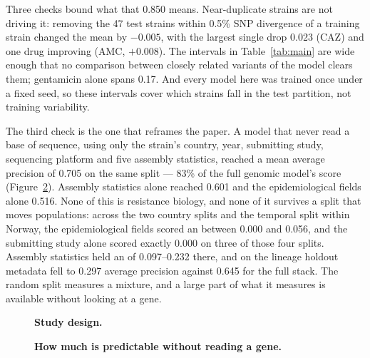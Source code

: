 Three checks bound what that 0.850 means. Near-duplicate strains are not driving it: removing the 47
test strains within 0.5\% SNP divergence of a training strain changed the mean by $-0.005$, with the
largest single drop 0.023 (CAZ) and one drug improving (AMC, $+0.008$). The intervals in
Table~\ref{tab:main} are wide enough that no comparison between closely related variants of the
model clears them; gentamicin alone spans 0.17. And every model here was trained once under a fixed
seed, so these intervals cover which strains fall in the test partition, not training variability.

The third check is the one that reframes the paper. A model that never read a base of sequence,
using only the strain's country, year, submitting study, sequencing platform and five assembly
statistics, reached a mean average precision of 0.705 on the same split --- 83\% of the full
genomic model's score (Figure~\ref{fig:floor}). Assembly statistics alone reached 0.601 and the
epidemiological fields alone 0.516. None of this is resistance biology, and none of it survives a
split that moves populations: across the two country splits and the temporal split within Norway,
the epidemiological fields scored an \nap{} between 0.000 and 0.056, and the submitting study alone
scored exactly 0.000 on three of those four splits. Assembly statistics held an \nap{} of
0.097--0.232 there, and on the lineage holdout metadata fell to 0.297 average precision against
0.645 for the full stack. The random split measures a mixture, and a large part of what it measures
is available without looking at a gene.

\begin{figure}[t]\centering
{}
\caption{\textbf{Study design.} }\label{fig:design}
\end{figure}

\begin{figure}[t]\centering
{}
\caption{\textbf{How much is predictable without reading a gene.} }\label{fig:floor}
\end{figure}

